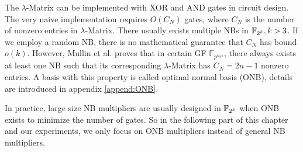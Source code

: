 The $\lambda$-Matrix can be implemented with XOR and AND gates in circuit design.
The very naive implementation requires $O(C_N)$ gates, where $C_N$ is the number of
nonzero entries in $\lambda$-Matrix.
There usually exists multiple NBs in ${\mathbb{F}}_{2^k}, k>3$. If we employ a random NB, there is no mathematical
guarantee that $C_N$ has bound $o(k)$. However,
Mullin et al. \cite{mullinONB} %
proves that in certain GF $\mathbb F_{p^{k_{opt}}}$, there always exists at least one NB such that 
its corresponding $\lambda$-Matrix has $C_N = 2n-1$ nonzero entries. A basis with this property is
called optimal normal basis (ONB), details are introduced in appendix \ref{append:ONB}.

In practice, large size NB multipliers are usually designed in ${\mathbb{F}}_{2^k}$ when ONB exists
to minimize the number of gates. So in the following part of this chapter and our experiments,
we only focus on ONB multipliers instead of general NB multipliers.


